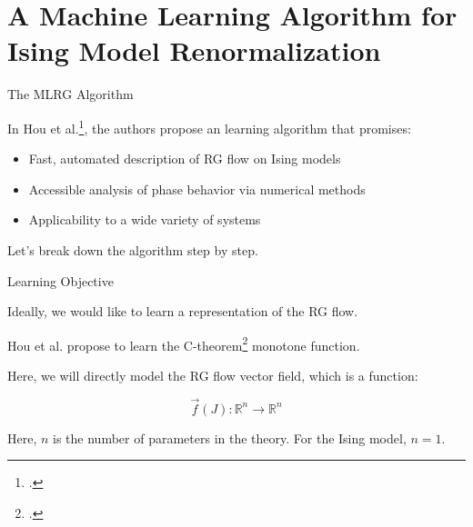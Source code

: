 \documentclass[aspectratio=169, 12pt]{beamer}
\begin{document}
\section{A Machine Learning Algorithm for Ising Model Renormalization}

\begin{frame}{The MLRG Algorithm}

    In Hou et al.\footcite{mlrg}, the authors propose an learning algorithm that promises:
    \begin{itemize}
        \item Fast, automated description of RG flow on Ising models
        \item Accessible analysis of phase behavior via numerical methods
        \item Applicability to a wide variety of systems
    \end{itemize}

    Let's break down the algorithm step by step. 
    
\end{frame}

\begin{frame}{Learning Objective}

    Ideally, we would like to learn a representation of the RG flow. 

    \vspace{1em}

    Hou et al. propose to learn the C-theorem\footcite{c-theorem} monotone function. 

    \vspace{1em}

    Here, we will directly model the RG flow vector field, which is a function:
    
    \[
    \vec{f}(J) : \mathbb{R}^n \rightarrow \mathbb{R}^n
    \]

    Here, $n$ is the number of parameters in the theory. 
    For the Ising model, $n=1$. 
    
\end{frame}
\end{document}
